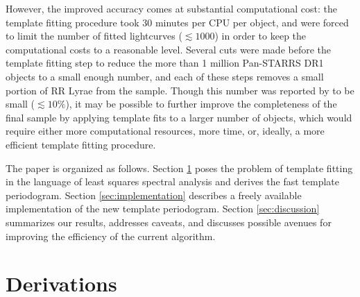 \documentclass[apj]{emulateapj}
\newcommand{\todo}[1]{{\bf #1}}
\begin{document}
However, the improved accuracy comes at substantial computational cost: the template fitting 
procedure took 30 minutes per CPU per object, and \cite{Sesar_etal_2016} were forced to limit
the number of fitted lightcurves ($\lesssim 1000$) in order to keep the computational costs
to a reasonable level. Several cuts were made before the template fitting step to reduce the
more than 1 million Pan-STARRS DR1 objects to a small enough number, and each of these steps
removes a small portion of RR Lyrae from the sample. Though this number was reported by
\cite{Sesar_etal_2016} to be small ($\lesssim 10\%$), it may be possible to further improve
the completeness of the final sample by applying template fits to a larger number of objects,
which would require either more computational resources, more time, or, ideally, a more efficient
template fitting procedure.

The paper is organized as follows. Section \ref{sec:derivations} poses the problem of template
fitting in the language of least squares spectral analysis and derives the fast template
periodogram. Section \ref{sec:implementation} describes a freely available implementation 
of the new template periodogram. Section \ref{sec:discussion} summarizes our results, 
addresses caveats, and discusses possible avenues for improving the efficiency of the current 
algorithm.





\section{Derivations}\label{sec:derivations}
\end{document}
